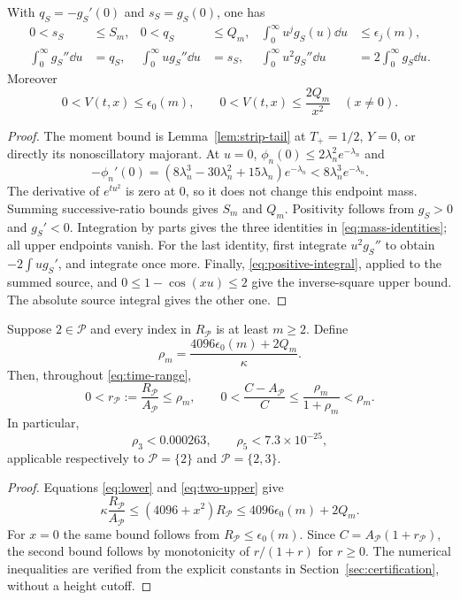 \begin{lemma}\label{lem:mass}
With $q_S=-g_S'(0)$ and $s_S=g_S(0)$, one has
\begin{align}
 0<s_S&\le S_m,&0<q_S&\le Q_m,&
 \int_0^\infty u^j g_S(u)\dd u&\le\epsilon_j(m),\label{eq:mass-bounds}\\
 \int_0^\infty g_S''\dd u&=q_S,&
 \int_0^\infty u g_S''\dd u&=s_S,&
 \int_0^\infty u^2g_S''\dd u&=2\int_0^\infty g_S\dd u.\label{eq:mass-identities}
\end{align}
Moreover
\begin{equation}\label{eq:two-upper}
 0<V(t,x)\le\epsilon_0(m),\qquad
 0<V(t,x)\le\frac{2Q_m}{x^2}\quad(x\ne0).
\end{equation}
\end{lemma}
\begin{proof}
The moment bound is Lemma~\ref{lem:strip-tail} at $T_+=1/2$, $Y=0$,
or directly its nonoscillatory majorant. At $u=0$,
$\phi_n(0)\le2\lambda_n^2e^{-\lambda_n}$ and
\[
 -\phi_n'(0)
 =(8\lambda_n^3-30\lambda_n^2+15\lambda_n)e^{-\lambda_n}
 <8\lambda_n^3e^{-\lambda_n}.
\]
The derivative of $e^{tu^2}$ is zero at $0$, so it does not change this
endpoint mass. Summing successive-ratio bounds gives $S_m$ and $Q_m$.
Positivity follows from $g_S>0$ and $g_S'<0$. Integration by parts gives
the three identities in \eqref{eq:mass-identities}; all upper endpoints
vanish. For the last identity, first integrate $u^2g_S''$ to obtain
$-2\int u g_S'$, and integrate once more. Finally,
\eqref{eq:positive-integral}, applied to the summed source, and
$0\le1-\cos(xu)\le2$ give the inverse-square upper bound.
The absolute source integral gives the other one.
\end{proof}

\begin{theorem}\label{thm:relative}
Suppose $2\in\mathcal P$ and every index in $R_{\mathcal P}$ is at least
$m\ge2$. Define
\begin{equation}\label{eq:rho}
 \rho_m=\frac{4096\epsilon_0(m)+2Q_m}{\kappa}.
\end{equation}
Then, throughout \eqref{eq:time-range},
\begin{equation}\label{eq:relative}
 0<r_{\mathcal P}:=\frac{R_{\mathcal P}}{A_{\mathcal P}}\le\rho_m,
 \qquad
 0<\frac{C-A_{\mathcal P}}{C}
      \le\frac{\rho_m}{1+\rho_m}<\rho_m.
\end{equation}
In particular,
\[
 \rho_3<0.000263,\qquad \rho_5<7.3\times10^{-25},
\]
applicable respectively to $\mathcal P=\{2\}$ and $\mathcal P=\{2,3\}$.
\end{theorem}
\begin{proof}
Equations \eqref{eq:lower} and \eqref{eq:two-upper} give
\[
 \kappa\frac{R_{\mathcal P}}{A_{\mathcal P}}
 \le(4096+x^2)R_{\mathcal P}
 \le4096\epsilon_0(m)+2Q_m.
\]
For $x=0$ the same bound follows from $R_{\mathcal P}\le\epsilon_0(m)$.
Since $C=A_{\mathcal P}(1+r_{\mathcal P})$, the second bound follows by
monotonicity of $r/(1+r)$ for $r\ge0$. The numerical inequalities are
verified from the explicit constants in
Section~\ref{sec:certification}, without a height cutoff.
\end{proof}

